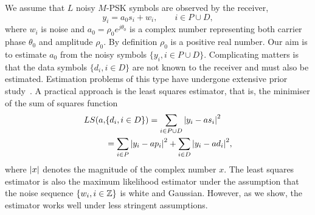 \documentclass[journal]{IEEEtran}
\begin{document}
We assume that %
$L$ noisy $M$-PSK symbols are observed by the receiver,  %
\begin{equation}\label{eq:sigmod}
y_i = a_0 s_i + w_i, \qquad i \in P \cup D,
\end{equation}
where $w_i$ is noise and $a_0 = \rho_0 e^{j\theta_0}$ is a complex number representing both carrier phase $\theta_0$ and amplitude $\rho_0$.  By definition $\rho_0$ is a positive real number.  Our aim is to estimate $a_0$ from the noisy symbols $\{ y_i, i \in P \cup D \}$.  Complicating matters is that the data symbols $\{d_i, i \in D\}$ are not known to the receiver and must also be estimated.  Estimation problems of this type have undergone extensive prior study~\cite{ViterbiViterbi_phase_est_1983,Cowley_ref_sym_carr_1998,Wilson1989,Makrakis1990,Liu1991,Mackenthun1994,Sweldens2001,McKilliamLinearTimeBlockPSK2009,Divsalar1990,580211,974597,Mengali_andre_synchro_book}.  A practical approach is the least squares estimator, that is, the minimiser of the sum of squares function
\begin{equation}\label{eq:LSdefn}
\begin{split}
LS(a, &\{d_i, i \in D\}) = \sum_{i \in P \cup D} {\left\vert  y_i - a s_i  \right\vert}^2  \\
&= \sum_{i \in P} {\left\vert  y_i - a p_i  \right\vert}^2 + \sum_{i \in D} {\left\vert  y_i - a d_i  \right\vert}^2,
\end{split}
\end{equation}
where ${\left\vert x \right\vert}$ denotes the magnitude of the complex number $x$.  The least squares estimator is also the maximum likelihood estimator under the assumption that the noise sequence $\{w_i, i \in {\mathbb Z}\}$ is white and Gaussian.  However, as we show, the estimator works well under less stringent assumptions.  %
\end{document}

